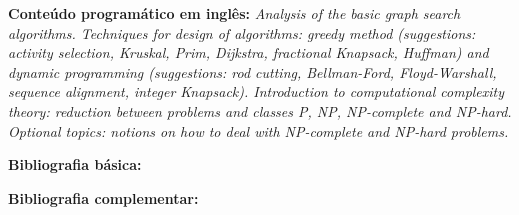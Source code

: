 \documentclass[class=article, crop=false]{standalone}
\begin{document}
\textbf{Conteúdo programático em inglês:}
\textit{Analysis of the basic graph search algorithms.
Techniques for design of algorithms: greedy method (suggestions: activity
selection, Kruskal, Prim, Dijkstra, fractional Knapsack, Huffman) and dynamic
programming (suggestions: rod cutting, Bellman-Ford, Floyd-Warshall, sequence
alignment, integer Knapsack).
Introduction to computational complexity theory: reduction between problems and
classes P, NP, NP-complete and NP-hard.
Optional topics: notions on how to deal with NP-complete and NP-hard problems.}

\newrefsection
\textbf{Bibliografia básica:}
\nocite{2002-cormen-etal, 2008-dasgupta-etal, 2002-sedgewick}
\printbibliography

\newrefsection
\textbf{Bibliografia complementar:}
\nocite{1998-sedgewick, 2011-sedgewick-wayne, 2006-kleinberg-tardos, 1989-manber}
\printbibliography
\end{document}
